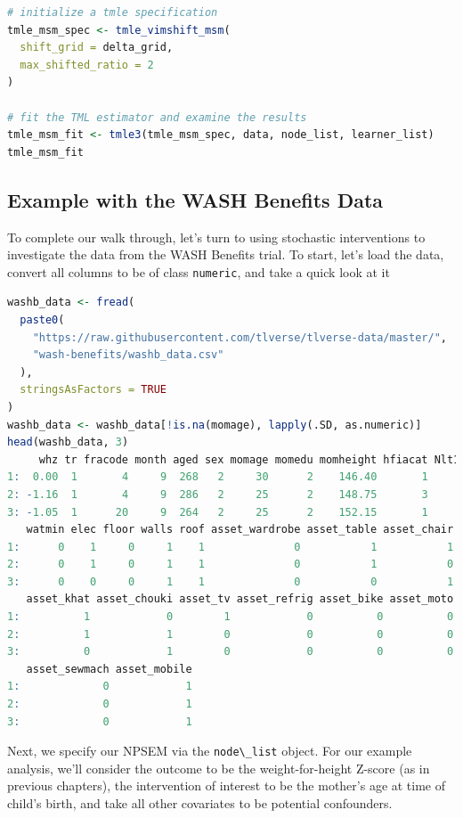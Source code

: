 \documentclass[
  12pt, krantz2,
]{krantz}
\newcommand{\passthrough}[1]{#1}
\newcommand{\1}{\mathbbm{1}}
\theoremstyle{definition}
\theoremstyle{definition}
\theoremstyle{definition}
\theoremstyle{definition}
\theoremstyle{remark}
\begin{document}
\begin{lstlisting}[language=R]
# initialize a tmle specification
tmle_msm_spec <- tmle_vimshift_msm(
  shift_grid = delta_grid,
  max_shifted_ratio = 2
)

# fit the TML estimator and examine the results
tmle_msm_fit <- tmle3(tmle_msm_spec, data, node_list, learner_list)
tmle_msm_fit
\end{lstlisting}

\hypertarget{example-with-the-wash-benefits-data}{%
\subsection{Example with the WASH Benefits Data}\label{example-with-the-wash-benefits-data}}

To complete our walk through, let's turn to using stochastic interventions to
investigate the data from the WASH Benefits trial. To start, let's load the
data, convert all columns to be of class \passthrough{\lstinline!numeric!}, and take a quick look at it

\begin{lstlisting}[language=R]
washb_data <- fread(
  paste0(
    "https://raw.githubusercontent.com/tlverse/tlverse-data/master/",
    "wash-benefits/washb_data.csv"
  ),
  stringsAsFactors = TRUE
)
washb_data <- washb_data[!is.na(momage), lapply(.SD, as.numeric)]
head(washb_data, 3)
     whz tr fracode month aged sex momage momedu momheight hfiacat Nlt18 Ncomp
1:  0.00  1       4     9  268   2     30      2    146.40       1     3    11
2: -1.16  1       4     9  286   2     25      2    148.75       3     2     4
3: -1.05  1      20     9  264   2     25      2    152.15       1     1    10
   watmin elec floor walls roof asset_wardrobe asset_table asset_chair
1:      0    1     0     1    1              0           1           1
2:      0    1     0     1    1              0           1           0
3:      0    0     0     1    1              0           0           1
   asset_khat asset_chouki asset_tv asset_refrig asset_bike asset_moto
1:          1            0        1            0          0          0
2:          1            1        0            0          0          0
3:          0            1        0            0          0          0
   asset_sewmach asset_mobile
1:             0            1
2:             0            1
3:             0            1
\end{lstlisting}

Next, we specify our NPSEM via the \passthrough{\lstinline!node\_list!} object. For our example analysis,
we'll consider the outcome to be the weight-for-height Z-score (as in previous
chapters), the intervention of interest to be the mother's age at time of
child's birth, and take all other covariates to be potential confounders.
\end{document}
